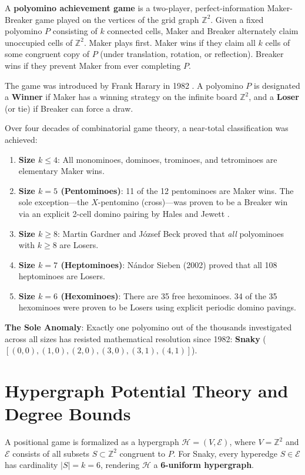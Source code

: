 \documentclass[11pt,a4paper]{article}
\begin{document}
A \textbf{polyomino achievement game} is a two-player, perfect-information Maker-Breaker game played on the vertices of the grid graph $\mathbb{Z}^2$. Given a fixed polyomino $P$ consisting of $k$ connected cells, Maker and Breaker alternately claim unoccupied cells of $\mathbb{Z}^2$. Maker plays first. Maker wins if they claim all $k$ cells of some congruent copy of $P$ (under translation, rotation, or reflection). Breaker wins if they prevent Maker from ever completing $P$.

The game was introduced by Frank Harary in 1982 \cite{harary1982}. A polyomino $P$ is designated a \textbf{Winner} if Maker has a winning strategy on the infinite board $\mathbb{Z}^2$, and a \textbf{Loser} (or tie) if Breaker can force a draw.

Over four decades of combinatorial game theory, a near-total classification was achieved:
\begin{enumerate}
    \item \textbf{Size $k \le 4$}: All monominoes, dominoes, trominoes, and tetrominoes are elementary Maker wins.
    \item \textbf{Size $k = 5$ (Pentominoes)}: 11 of the 12 pentominoes are Maker wins. The sole exception---the $X$-pentomino (cross)---was proven to be a Breaker win via an explicit 2-cell domino pairing by Hales and Jewett \cite{hales1963}.
    \item \textbf{Size $k \ge 8$}: Martin Gardner \cite{gardner1979} and J\'ozsef Beck \cite{beck1981} proved that \emph{all} polyominoes with $k \ge 8$ are Losers.
    \item \textbf{Size $k = 7$ (Heptominoes)}: N\'andor Sieben (2002) \cite{sieben2008} proved that all 108 heptominoes are Losers.
    \item \textbf{Size $k = 6$ (Hexominoes)}: There are 35 free hexominoes. 34 of the 35 hexominoes were proven to be Losers using explicit periodic domino pavings.
\end{enumerate}

\textbf{The Sole Anomaly}: Exactly one polyomino out of the thousands investigated across all sizes has resisted mathematical resolution since 1982: \textbf{Snaky} ($[(0,0), (1,0), (2,0), (3,0), (3,1), (4,1)]$).

\section{Hypergraph Potential Theory and Degree Bounds}

A positional game is formalized as a hypergraph $\mathcal{H} = (V, \mathcal{E})$, where $V = \mathbb{Z}^2$ and $\mathcal{E}$ consists of all subsets $S \subset \mathbb{Z}^2$ congruent to $P$. For Snaky, every hyperedge $S \in \mathcal{E}$ has cardinality $|S| = k = 6$, rendering $\mathcal{H}$ a \textbf{6-uniform hypergraph}.
\end{document}
